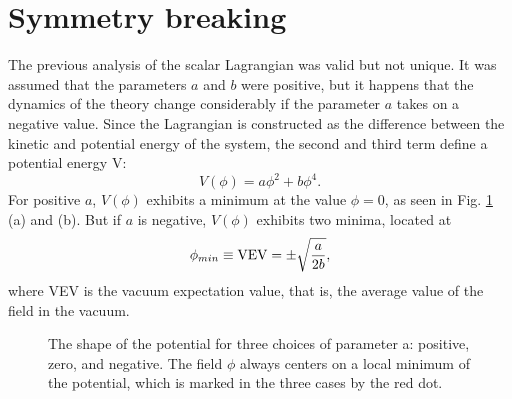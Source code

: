 \section{Symmetry breaking}
The previous analysis of the scalar Lagrangian was valid but not unique. It was assumed that the parameters $a$ and $b$ were positive, but it happens that the dynamics of the theory change considerably if the parameter $a$ takes on a negative value. Since the Lagrangian is constructed as the difference between the kinetic and potential energy of the system, the second and third term define a potential energy V:
\begin{equation}
V(\phi) = a\phi^2 + b\phi^4.
\end{equation}
For positive $a$, $V(\phi)$ exhibits a minimum at the value $\phi=0$, as seen in Fig. \ref{fig:SSB} (a) and (b). But if $a$ is negative, $V(\phi)$ exhibits two minima, located at 
\begin{equation}
\phi_{min} \equiv {\rm VEV} = \pm \sqrt{\frac{a}{2b}},
\end{equation}
where VEV is the vacuum expectation value, that is, the average value of the field in the vacuum.
\begin{figure}[h]
\centering
\hspace{-0.3cm}
\hspace{-0.3cm}
\hspace{-0.3cm}
\caption{The shape of the potential for three choices of parameter a: positive, zero, and negative. The field $\phi$ always centers on a local minimum of the potential, which is marked in the three cases by the red dot. }
\label{fig:SSB}
\end{figure}

